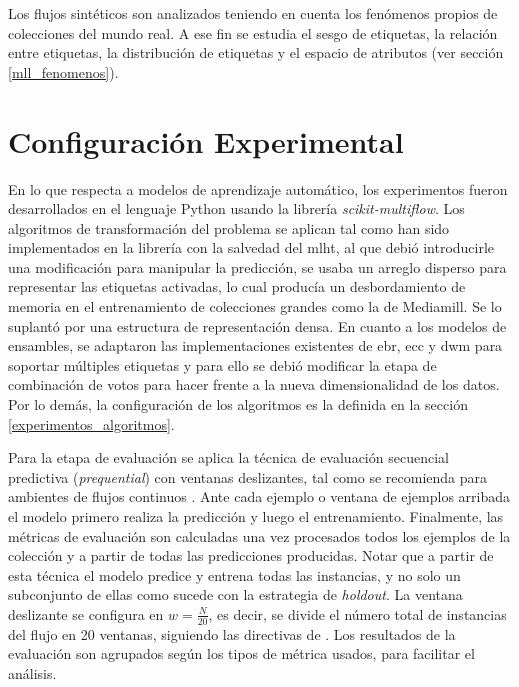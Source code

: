 Los flujos sintéticos son analizados teniendo en cuenta los fenómenos propios de
colecciones del mundo real. A ese fin se estudia el sesgo de etiquetas, la
relación entre etiquetas, la distribución de etiquetas y el espacio de atributos
(ver sección \ref{mll_fenomenos}). 

\section{Configuración Experimental}

En lo que respecta a modelos de aprendizaje automático, los experimentos fueron
desarrollados en el lenguaje Python usando la librería
\textit{scikit-multiflow}. Los algoritmos de transformación del problema se
aplican tal como han sido implementados en la librería con la salvedad del
\acrshort{mlht}, al que debió introducirle una modificación para manipular la
predicción, se usaba un arreglo disperso para representar las etiquetas
activadas, lo cual producía un desbordamiento de memoria en el entrenamiento de
colecciones grandes como la de Mediamill. Se lo suplantó por una estructura de
representación densa. En cuanto a los modelos de ensambles, se adaptaron las
implementaciones existentes de \acrshort{ebr}, \acrshort{ecc} y \acrshort{dwm}
para soportar múltiples etiquetas y para ello se debió modificar la etapa de
combinación de votos para hacer frente a la nueva dimensionalidad de los datos.
Por lo demás, la configuración de los algoritmos es la definida en la sección
\ref{experimentos_algoritmos}.

Para la etapa de evaluación se aplica la técnica de evaluación secuencial
predictiva (\textit{prequential}) con ventanas deslizantes, tal como se
recomienda para ambientes de flujos continuos \cite{gama_evaluating_2013}. Ante
cada ejemplo o ventana de ejemplos arribada el modelo primero realiza la
predicción y luego el entrenamiento. Finalmente, las métricas de evaluación son
calculadas una vez procesados todos los ejemplos de la colección y a partir de
todas las predicciones producidas.  Notar que a partir de esta técnica el modelo
predice y entrena todas las instancias, y no solo un subconjunto de ellas como
sucede con la estrategia de \textit{holdout}. La ventana deslizante se configura
en $w = \frac{N}{20}$, es decir, se divide el número total de instancias del
flujo en 20 ventanas, siguiendo las directivas de \textcite{read_scalable_2012}.
Los resultados de la evaluación son agrupados según los tipos de métrica usados,
para facilitar el análisis.

